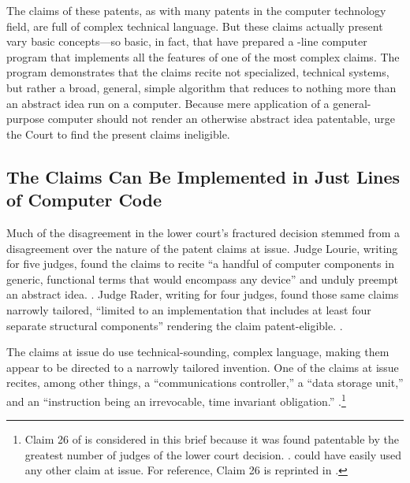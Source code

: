 \documentclass{scotus}
\begin{document}
The claims of these patents, as with many patents in the computer technology
field, are full of complex technical language.
But these claims actually present vary basic concepts---so basic, in fact, that
\amici have prepared a \numlines-line computer program
that implements all the features of one of the most complex claims. The program
demonstrates that the claims recite not specialized, technical systems, but
rather a broad, general, simple algorithm that reduces to nothing more than an
abstract idea run on a computer. Because mere application of a general-purpose
computer should not render an otherwise abstract idea patentable, \amici
urge the Court to find the present claims ineligible.



%
%
\subsection{The Claims Can Be Implemented in Just \Numlines Lines of
Computer Code}

Much of the disagreement in the lower court's fractured decision stemmed
from a disagreement over the nature of the patent claims at issue. Judge Lourie,
writing for five judges,
found the claims to recite ``a handful of
computer components in generic, functional terms that would encompass any
device'' and unduly preempt an abstract idea. .
Judge Rader, writing for four judges, found those same claims narrowly tailored,
``limited to an implementation that includes at least four separate structural
components'' rendering the claim patent-eligible. .

The claims at issue do use technical-sounding, complex language, making them
appear to be directed to a narrowly tailored invention. One of the claims at
issue recites, among other things, a ``communications controller,'' a
``data storage unit,'' and an ``instruction being an irrevocable, time invariant
obligation.'' .\footnote{Claim 26 of
 is considered in this brief because it was found patentable by
the greatest number of judges of the lower court decision. .
\Amici could have easily used any other claim at issue.
For reference, Claim
26 is reprinted in .}
\end{document}
